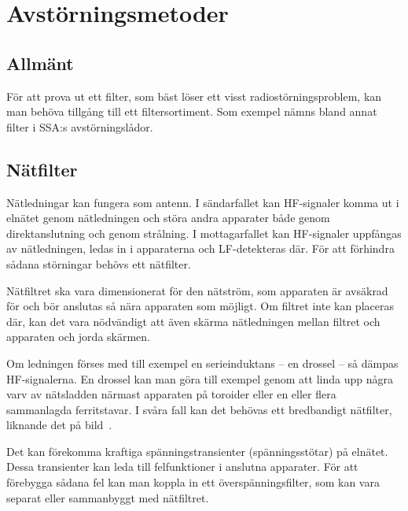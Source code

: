 \section{Avstörningsmetoder}
\label{sec:avstoerning}


\subsection{Allmänt}
För att prova ut ett filter, som bäst löser ett visst radiostörningsproblem,
kan man behöva tillgång till ett filtersortiment.
Som exempel nämns bland annat filter i SSA:s avstörningslådor.

\subsection{Nätfilter}

Nätledningar kan fungera som antenn.
I sändarfallet kan HF-signaler komma ut i elnätet genom nätledningen och störa
andra apparater både genom direktanslutning och genom strålning.
I mottagarfallet kan HF-signaler uppfångas av nätledningen, ledas in i
apparaterna och LF-detekteras där.
För att förhindra sådana störningar behövs ett nätfilter.

Nätfiltret ska vara dimensionerat för den nätström, som apparaten är avsäkrad
för och bör anslutas så nära apparaten som möjligt.
Om filtret inte kan placeras där, kan det vara nödvändigt att även skärma
nätledningen mellan filtret och apparaten och jorda skärmen.

Om ledningen förses med till exempel en serieinduktans -- en drossel -- så
dämpas HF-signalerna.
En drossel kan man göra till exempel genom att linda upp några varv av nätsladden
närmast apparaten på toroider eller en eller flera sammanlagda ferritstavar.
I svåra fall kan det behövas ett bredbandigt nätfilter, liknande
det på bild~.

Det kan förekomma kraftiga spänningstransienter (spänningsstötar) på elnätet.
Dessa transienter kan leda till felfunktioner i anslutna apparater.
För att förebygga sådana fel kan man koppla in ett överspänningsfilter, som kan
vara separat eller sammanbyggt med nätfiltret.

